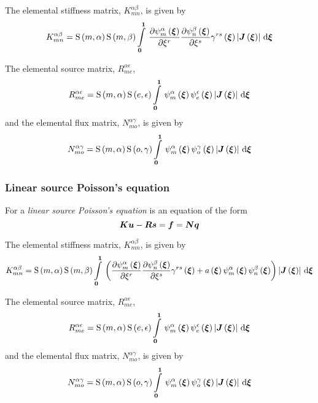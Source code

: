 The elemental stiffness matrix, $K^{\alpha\beta}_{mn}$, is given by
\begin{equation}
  K^{\alpha\beta}_{mn}=\gsf{m}{\alpha}\gsf{m}{\beta}
  \gint{\vectr{0}}{\vectr{1}}{\delby{\gbfn{m}{\alpha}{\vectr{\xi}}}{\xi^{r}}
    \delby{\gbfn{n}{\beta}{\vectr{\xi}}}{\xi^{s}}\fnof{\gamma^{rs}}{\vectr{\xi}}
    \abs{\fnof{\matr{J}}{\vectr{\xi}}}}{\vectr{\xi}}
  \label{eqn:elementalfemlhs2}
\end{equation}

The elemental source matrix, $R^{\alpha\epsilon}_{me}$, 
\begin{equation}
  R^{\alpha\epsilon}_{me}=\gsf{m}{\alpha}\gsf{e}{\epsilon}
  \gint{\vectr{0}}{\vectr{1}}{\gbfn{m}{\alpha}{\vectr{\xi}}\gbfn{e}{\epsilon}{\vectr{\xi}}
    \abs{\fnof{\matr{J}}{\vectr{\xi}}}}{\vectr{\xi}}
\end{equation}
and the elemental flux matrix, $N^{\alpha\gamma}_{mo}$, is given by
\begin{equation}
  N^{\alpha\gamma}_{mo} =\gsf{m}{\alpha}\gsf{o}{\gamma}
  \gint{\vectr{0}}{\vectr{1}}{\gbfn{m}{\alpha}{\vectr{\xi}}\gbfn{o}{\gamma}{\vectr{\xi}}
    \abs{\fnof{\matr{J}}{\vectr{\xi}}}}{\vectr{\xi}}
\end{equation}

\subsubsection{Linear source Poisson's equation}

For a \emph{linear source Poisson's equation}
  is an equation of the form
\begin{equation}
  \matr{K}\vect{u}-\matr{R}\vect{s}=\vect{f}=\matr{N}\vect{q}
\end{equation}

The elemental stiffness matrix, $K^{\alpha\beta}_{mn}$, is given by
\begin{equation}
  K^{\alpha\beta}_{mn}=\gsf{m}{\alpha}\gsf{m}{\beta}
  \gint{\vectr{0}}{\vectr{1}}{\pbrac{\delby{\gbfn{m}{\alpha}{\vectr{\xi}}}{\xi^{r}}
      \delby{\gbfn{n}{\beta}{\vectr{\xi}}}{\xi^{s}}\fnof{\gamma^{rs}}{\vectr{\xi}}+
      \fnof{a}{\vectr{\xi}}\gbfn{m}{\alpha}{\vectr{\xi}}\gbfn{n}{\beta}{\vectr{\xi}}}
    \abs{\fnof{\matr{J}}{\vectr{\xi}}}}{\vectr{\xi}}
  \label{eqn:elementalfemlhs2}
\end{equation}

The elemental source matrix, $R^{\alpha\epsilon}_{me}$, 
\begin{equation}
  R^{\alpha\epsilon}_{me}=\gsf{m}{\alpha}\gsf{e}{\epsilon}
  \gint{\vectr{0}}{\vectr{1}}{\gbfn{m}{\alpha}{\vectr{\xi}}\gbfn{e}{\epsilon}{\vectr{\xi}}
    \abs{\fnof{\matr{J}}{\vectr{\xi}}}}{\vectr{\xi}}
\end{equation}
and the elemental flux matrix, $N^{\alpha\gamma}_{mo}$, is given by
\begin{equation}
  N^{\alpha\gamma}_{mo} =\gsf{m}{\alpha}\gsf{o}{\gamma}
  \gint{\vectr{0}}{\vectr{1}}{\gbfn{m}{\alpha}{\vectr{\xi}}\gbfn{o}{\gamma}{\vectr{\xi}}
    \abs{\fnof{\matr{J}}{\vectr{\xi}}}}{\vectr{\xi}}
\end{equation}

